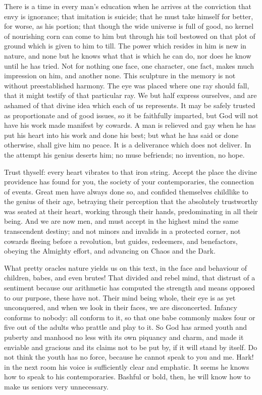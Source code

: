 \documentclass[12pt]{article}
\begin{document}
There is a time in every man's education when he arrives at the conviction
that envy is ignorance; that imitation is suicide; that he must take himself
for better, for worse, as his portion; that though the wide universe is full
of good, no kernel of nourishing corn can come to him but through his toil
bestowed on that plot of ground which is given to him to till. The power
which resides in him is new in nature, and none but he knows what that is
which he can do, nor does he know until he has tried. Not for nothing one
face, one character, one fact, makes much impression on him, and another
none. This sculpture in the memory is not without preestablished harmony.
The eye was placed where one ray should fall, that it might testify of that
particular ray. We but half express ourselves, and are ashamed of that
divine idea which each of us represents. It may be safely trusted as
proportionate and of good issues, so it be faithfully imparted, but God will
not have his work made manifest by cowards. A man is relieved and gay when
he has put his heart into his work and done his best; but what he has said
or done otherwise, shall give him no peace. It is a deliverance which does
not deliver. In the attempt his genius deserts him; no muse befriends; no
invention, no hope.

Trust thyself: every heart vibrates to that iron string. Accept the place
the divine providence has found for you, the society of your contemporaries,
the connection of events. Great men have always done so, and confided
themselves childlike to the genius of their age, betraying their perception
that the absolutely trustworthy was seated at their heart, working through
their hands, predominating in all their being. And we are now men, and must
accept in the highest mind the same transcendent destiny; and not minors and
invalids in a protected corner, not cowards fleeing before a revolution, but
guides, redeemers, and benefactors, obeying the Almighty effort, and
advancing on Chaos and the Dark.

What pretty oracles nature yields us on this text, in the face and behaviour
of children, babes, and even brutes! That divided and rebel mind, that
distrust of a sentiment because our arithmetic has computed the strength and
means opposed to our purpose, these have not. Their mind being whole, their
eye is as yet unconquered, and when we look in their faces, we are
disconcerted. Infancy conforms to nobody: all conform to it, so that one
babe commonly makes four or five out of the adults who prattle and play to
it. So God has armed youth and puberty and manhood no less with its own
piquancy and charm, and made it enviable and gracious and its claims not to
be put by, if it will stand by itself. Do not think the youth has no force,
because he cannot speak to you and me. Hark! in the next room his voice is
sufficiently clear and emphatic. It seems he knows how to speak to his
contemporaries. Bashful or bold, then, he will know how to make us seniors
very unnecessary.
\end{document}
